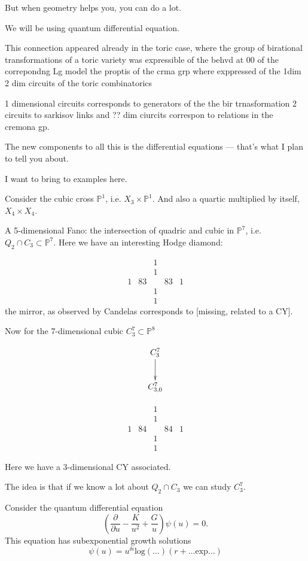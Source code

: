 But when geometry helps you, you can do a
lot.

We will be using quantum differential
equation.

This connection appeared already in
the toric case, where the group
of birational transformations
of a toric variety was expressible
of the behvd at 00 of the correpondng
Lg model
the proptis of the crma grp where exppressed
of the 1dim 2 dim circuits
of the toric combinatorics

1 dimensional circuits corresponds
to generators of the the bir trnasformation
2 circuits to sarkisov links
and ?? dim ciurcits
correspon to relations in the cremona gp.

The new components to all this
is the differential equations ---
that's what I plan to tell you about.

I want to bring to examples here.

Consider the cubic cross $\mathbb{P}^1$,
i.e. $X_3 \times \mathbb{P}^1$.
And also a quartic multiplied by itself,
$X_4 \times X_4$.

A 5-dimensional Fano: the intersection
of quadric and cubic in $\mathbb{P}^7$,
i.e. $Q_2 \cap C_3 \subset \mathbb{P}^7$.
Here we have an interesting Hodge diamond:

\[
\begin{array}{ccccc}
&&1&&\\
&&1&&\\
1&83&&83&1\\
&&1&&\\
&&1&&
\end{array}
\]
the mirror, as observed by Candelas 
corresponds to [missing, related to
a CY].

Now for  the 7-dimensional cubic
$C_3^7 \subset \mathbb{P}^8$

$$
\xymatrix{
C_3^7 \ar[d]\\
C_{3,0}^7
}
$$

\[
\begin{array}{ccccc}
&&1&&\\
&&1&&\\
1&84&&84&1\\
&&1&&\\
&&1&&
\end{array}
\]

\noindent
Here we have a 3-dimensional CY
associated.

The idea is that if we know a lot about
$Q_2 \cap C_3$ we can study $C_3^7$.

\medskip\noindent
Consider the quantum differential equation
$$
\left(\frac{\partial}{\partial u}
-\frac{K}{u^2}+\frac{G}{u}\right)
\psi(u)=0.
$$
This equation has subexponential growth
solutions
$$
\psi(u)=u^{\delta i}\text{log}(…)
(r+… \text{exp} …)
$$

